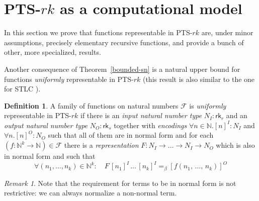 \documentclass{article}
\theoremstyle{definition}
\newtheorem{definition}{Definition}
\theoremstyle{remark}
\newtheorem*{remark}{Remark}
\begin{document}
\section{PTS-\texorpdfstring{$rk$}{rk} as a
computational model}
\label{computational}

In this section we prove that functions representable
in PTS-$rk$ are, under minor assumptions, precisely
elementary recursive functions, and provide a bunch of
other, more specialized, results.

Another consequence of Theorem~\ref{bounded-sn} is a
natural upper bound for functions \textit{uniformly}
representable in PTS-$rk$ (this result is also similar
to the one for STLC
\cite{schwichtenberg1976definierbare,
statman1979typed,fortune1983expressiveness}).

\begin{definition}
    A family of functions on natural numbers
    $\mathcal{F}$ is \emph{uniformly} representable in
    PTS-$rk$ if there is an \emph{input natural number
    type} $N_I:\mathsf{rk}_r$ and an \emph{output
    natural number type} $N_O:\mathsf{rk}_s$ together
    with \emph{encodings} $\forall n\in\mathbb{N}.[n]^I
    :N_I$ and $\forall n.[n]^O:N_O$ such that all of
    them are in normal form and for each
    $(f:\mathbb{N}^k\to\mathbb{N})\in\mathcal{F}$ there
    is a \emph{representation}
    $F:N_I\to\ldots\to N_I\to N_O$
    which is also in normal form and such that
    \[
        \forall (n_1,\ldots,n_k)\in\mathbb{N}^k:
        \quad F\,[n_1]^I\,\ldots\,[n_k]^I
        =_\beta [f(n_1,\,\ldots,\,n_k)]^O
    \]
\end{definition}

\begin{remark}
    Note that the requirement for terms to be in normal
    form is not restrictive: we can always normalize a
    non-normal term.
\end{remark}
\end{document}
